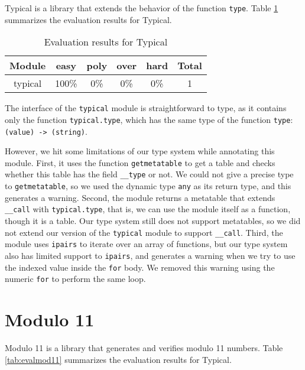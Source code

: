 Typical is a library that extends the behavior of the function \texttt{type}. 
Table \ref{tab:evaltypical} summarizes the evaluation results for Typical.

\begin{table}[!ht]
\begin{center}
\begin{tabular}{|c|c|c|c|c|c|}
\hline
\textbf{Module} & \textbf{easy} & \textbf{poly} & \textbf{over} & \textbf{hard} & \textbf{Total} \\
\hline
typical & 100\% & 0\% & 0\% & 0\% & 1 \\ %
\hline
\end{tabular}
\end{center}
\caption{Evaluation results for Typical}
\label{tab:evaltypical}
\end{table}

The interface of the \texttt{typical} module is straightforward to type,
as it contains only the function \texttt{typical.type},
which has the same type of the function \texttt{type}: \texttt{(value) -> (string)}.

However, we hit some limitations of our type system while annotating this module.
First, it uses the function \texttt{getmetatable} to get a table and
checks whether this table has the field \texttt{\string_\string_type} or not.
We could not give a precise type to \texttt{getmetatable}, so we used the dynamic
type \texttt{any} as its return type, and this generates a warning.
Second, the module returns a metatable that extends \texttt{\string_\string_call}
with \texttt{typical.type}, that is, we can use the module itself as a function,
though it is a table.
Our type system still does not support metatables, so we did not extend our version
of the \texttt{typical} module to support \texttt{\string_\string_call}.
Third, the module uses \texttt{ipairs} to iterate over an array of functions,
but our type system also has limited support to \texttt{ipairs}, and generates
a warning when we try to use the indexed value inside the \texttt{for} body.
We removed this warning using the numeric \texttt{for} to perform the same loop.

\section{Modulo 11}

Modulo 11 is a library that generates and verifies modulo 11 numbers.
Table \ref{tab:evalmod11} summarizes the evaluation results for Typical.

